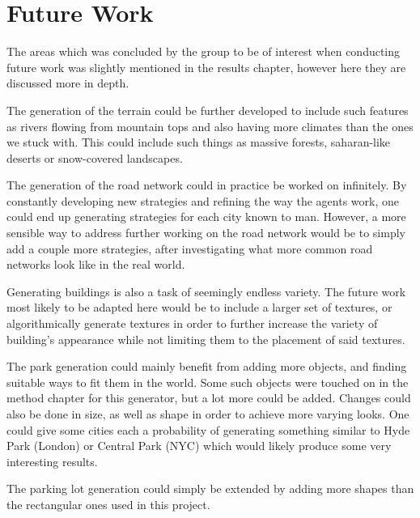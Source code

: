 \section{Future Work}
The areas which was concluded by the group to be of interest when conducting future work was slightly mentioned in the results chapter, however here they are discussed more in depth.

The generation of the terrain could be further developed to include such features as rivers flowing from mountain tops and also having more climates than the ones we stuck with.
This could include such things as massive forests, saharan-like deserts or snow-covered landscapes.

The generation of the road network could in practice be worked on infinitely.
By constantly developing new strategies and refining the way the agents work, one could end up generating strategies for each city known to man.
However, a more sensible way to address further working on the road network would be to simply add a couple more strategies, after investigating what more common road networks look like in the real world.

Generating buildings is also a task of seemingly endless variety. 
The future work most likely to be adapted here would be to include a larger set of textures, or algorithmically generate textures in order to further increase the variety of building's appearance while not limiting them to the placement of said textures. 

The park generation could mainly benefit from adding more objects, and finding suitable ways to fit them in the world.
Some such objects were touched on in the method chapter for this generator, but a lot more could be added.
Changes could also be done in size, as well as shape in order to achieve more varying looks. 
One could give some cities each a probability of generating something similar to Hyde Park (London) or Central Park (NYC) which would likely produce some very interesting results.

The parking lot generation could simply be extended by adding more shapes than the rectangular ones used in this project.


